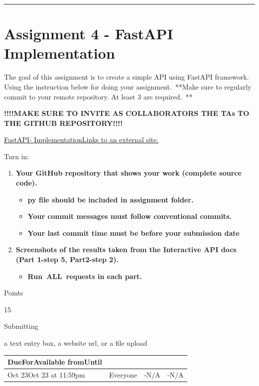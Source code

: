 \documentclass[
]{article}
\providecommand{\tightlist}{%
  \setlength{\itemsep}{0pt}\setlength{\parskip}{0pt}}
\begin{document}
\begin{center}\rule{0.5\linewidth}{0.5pt}\end{center}

\section{Assignment 4 - FastAPI
Implementation}\label{assignment-4---fastapi-implementation}

The goal of this assignment is to create a simple API using FastAPI
framework. Using the instruction below for doing your assignment.~**Make
sure to regularly commit to your remote repository. At least 3 are
required.~**

\textbf{!!!!MAKE SURE TO INVITE AS COLLABORATORS THE TAs TO THE GITHUB
REPOSITORY!!!!}

\href{https://docs.google.com/document/d/1JaDI09XzxiohC0ko6v3VS9BAPWd8l-pOrR7Y49KN1eM/edit?tab=t.0}{FastAPI-
ImplementationLinks to an external site.}

Turn in:

\begin{enumerate}
\def\labelenumi{\arabic{enumi}.}
\tightlist
\item
  \textbf{Your GitHub repository that shows your work (complete source
  code).}

  \begin{itemize}
  \tightlist
  \item
    \textbf{py file should be included in assignment folder.}
  \item
    \textbf{Your commit messages must follow conventional commits.}
  \item
    \textbf{Your last commit time must be before your submission date}
  \end{itemize}
\item
  \textbf{Screenshots of the results taken from the Interactive API docs
  (Part 1-step 5, Part2-step 2).}

  \begin{itemize}
  \tightlist
  \item
    \textbf{Run~ALL~requests in each part.}
  \end{itemize}
\end{enumerate}

Points

15

Submitting

a text entry box, a website url, or a file upload

\begin{longtable}[]{@{}llll@{}}
\toprule\noalign{}
DueForAvailable fromUntil & & & \\
\midrule\noalign{}
\endhead
\bottomrule\noalign{}
\endlastfoot
Oct 23Oct 23 at 11:59pm & Everyone & -N/A & -N/A \\
\end{longtable}
\end{document}
